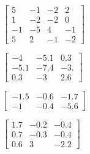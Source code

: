 \begin{exercise}
\begin{Parts}
\begin{reduce}
\item \(\begin{bmatrix} 5&-1&-2&2
\\1&-2&-2&0
\\-1&-5&4&-1
\\5&2&-1&-2 \end{bmatrix}\)
\end{reduce}

\item \(\begin{bmatrix} -4&-5.1&0.3
\\-5.1&-7.4&-3.
\\0.3&-3&2.6 \end{bmatrix}\)

\item \(\begin{bmatrix} -1.5&-0.6&-1.7
\\-1&-0.4&-5.6 \end{bmatrix}\)

\item \(\begin{bmatrix} 1.7&-0.2&-0.4
\\0.7&-0.3&-0.4
\\0.6&3&-2.2 \end{bmatrix}\)
\end{Parts}
\end{exercise}

